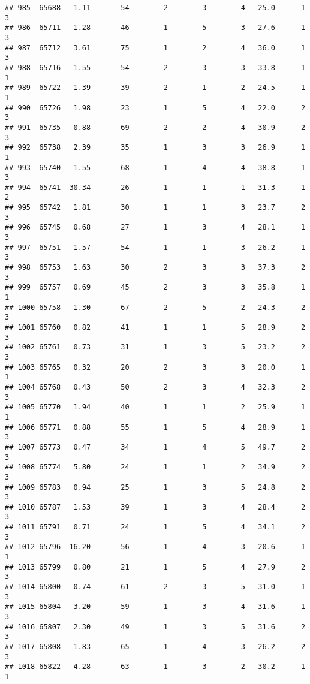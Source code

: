 \documentclass[
]{article}
\begin{document}
\begin{verbatim}
## 985  65688   1.11       54        2        3        4   25.0      1      3
## 986  65711   1.28       46        1        5        3   27.6      1      3
## 987  65712   3.61       75        1        2        4   36.0      1      3
## 988  65716   1.55       54        2        3        3   33.8      1      1
## 989  65722   1.39       39        2        1        2   24.5      1      1
## 990  65726   1.98       23        1        5        4   22.0      2      3
## 991  65735   0.88       69        2        2        4   30.9      2      3
## 992  65738   2.39       35        1        3        3   26.9      1      1
## 993  65740   1.55       68        1        4        4   38.8      1      3
## 994  65741  30.34       26        1        1        1   31.3      1      2
## 995  65742   1.81       30        1        1        3   23.7      2      3
## 996  65745   0.68       27        1        3        4   28.1      1      3
## 997  65751   1.57       54        1        1        3   26.2      1      3
## 998  65753   1.63       30        2        3        3   37.3      2      3
## 999  65757   0.69       45        2        3        3   35.8      1      1
## 1000 65758   1.30       67        2        5        2   24.3      2      3
## 1001 65760   0.82       41        1        1        5   28.9      2      3
## 1002 65761   0.73       31        1        3        5   23.2      2      3
## 1003 65765   0.32       20        2        3        3   20.0      1      1
## 1004 65768   0.43       50        2        3        4   32.3      2      3
## 1005 65770   1.94       40        1        1        2   25.9      1      1
## 1006 65771   0.88       55        1        5        4   28.9      1      3
## 1007 65773   0.47       34        1        4        5   49.7      2      3
## 1008 65774   5.80       24        1        1        2   34.9      2      3
## 1009 65783   0.94       25        1        3        5   24.8      2      3
## 1010 65787   1.53       39        1        3        4   28.4      2      3
## 1011 65791   0.71       24        1        5        4   34.1      2      3
## 1012 65796  16.20       56        1        4        3   20.6      1      1
## 1013 65799   0.80       21        1        5        4   27.9      2      3
## 1014 65800   0.74       61        2        3        5   31.0      1      3
## 1015 65804   3.20       59        1        3        4   31.6      1      3
## 1016 65807   2.30       49        1        3        5   31.6      2      3
## 1017 65808   1.83       65        1        4        3   26.2      2      3
## 1018 65822   4.28       63        1        3        2   30.2      1      1

\end{verbatim}
\end{document}
